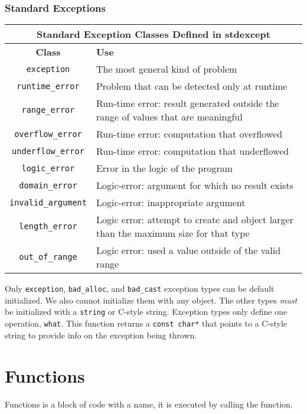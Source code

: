 \documentclass[12pt, a4paper]{report}
\begin{document}
\subsection{Standard Exceptions}
\begin{center}
  \begin{tabular}{ |c|p{}| }
    \hline
    \multicolumn{2}{|c|}{\textbf{Standard Exception Classes Defined in }stdexcept} \\
  \hline
  \textbf{Class}& \textbf{Use} \\
  \hline
  \verb|exception| & The most general kind of problem \\
  \hline
  \verb|runtime_error| & Problem that can be detected only at runtime \\
  \hline
  \verb|range_error| & Run-time error: result generated outside the range of values that are meaningful \\
  \hline
  \verb|overflow_error| & Run-time error: computation that overflowed \\
  \hline
  \verb|underflow_error| & Run-time error: computation that underflowed \\
  \hline
  \verb|logic_error| & Error in the logic of the program \\
  \hline
  \verb|domain_error| & Logic-error: argument for which no result exists \\
  \hline
  \verb|invalid_argument| & Logic-error: inappropriate argument \\
  \hline
  \verb|length_error| & Logic error: attempt to create and object larger than the maximum size for that type \\
  \hline
  \verb|out_of_range| & Logic error: used a value outside of the valid range \\
  \hline
    
  \end{tabular}
\end{center}
Only \verb|exception|, \verb|bad_alloc|, and \verb|bad_cast| exception types can be default initialized.
We also cannot initialize them with any object.
The other types \emph{must} be initialized with a \verb|string| or C-style string.
Exception types only define one operation, \verb|what|.
This function returns a \verb|const char*| that points to a C-style string to provide info on the exception being thrown.
\chapter{Functions}
Functions is a block of code with a name, it is executed by calling the function.
\end{document}
